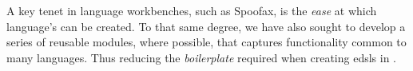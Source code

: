 A key tenet in language workbenches, such as Spoofax, is the \emph{ease} at which language's can be created.
To that same degree, we have also sought to develop a series of reusable modules, where possible, that captures functionality common to many languages.
Thus reducing the \emph{boilerplate} required when creating \acp{edsl} in \Idris{}.



